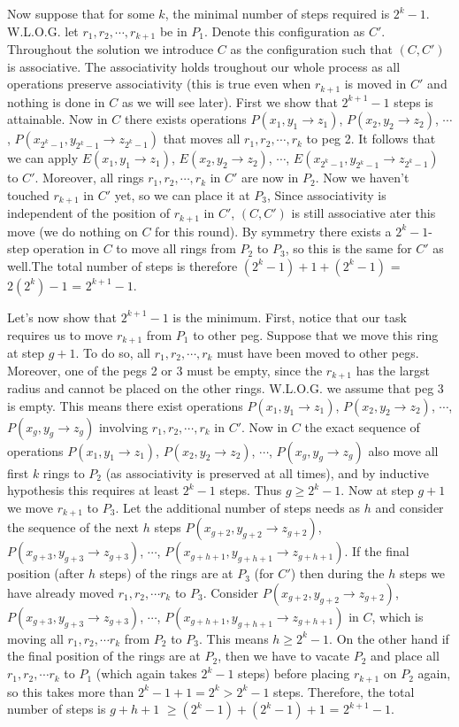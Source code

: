 \documentclass[11pt]{article}
\begin{document}
\begin{enumerate}
Now suppose that for some $k$, the minimal number of steps required is $2^k-1$. W.L.O.G. let $r_1, r_2,\cdots ,r_{k+1}$ be in $P_1$. Denote this configuration as $C'$. Throughout the solution we introduce $C$ as the configuration such that $(C, C')$ is associative. The associativity holds troughout our whole process as all operations preserve associativity (this is true even when $r_{k+1}$ is moved in $C'$ and nothing is done in $C$ as we will see later).
First we show that $2^{k+1}-1$ steps is attainable. Now in $C$ there exists operations $P(x_1, y_1\to z_1)$, $P(x_2, y_2\to z_2)$, $\cdots$, $P(x_{2^k-1}, y_{2^k-1}\to z_{2^k-1})$ that moves all $r_1, r_2, \cdots , r_k$ to peg 2. It follows that we can apply $E(x_1, y_1\to z_1)$, $E(x_2, y_2\to z_2)$, $\cdots$, $E(x_{2^k-1}, y_{2^k-1}\to z_{2^k-1})$ to $C'$. Moreover, all rings $r_1, r_2,\cdots ,r_k$ in $C'$ are now in $P_2$. Now we haven't touched $r_{k+1}$ in $C'$ yet, so we can place it at $P_3$, Since associativity is independent of the position of $r_{k+1}$ in $C'$, $(C, C')$ is still associative ater this move (we do nothing on $C$ for this round). By symmetry there exists a $2^k-1$-step operation in $C$ to move all rings from $P_2$ to $P_3$, so this is the same for $C'$ as well.The total number of steps is therefore $(2^k-1)+1+(2^k-1)$ = $2(2^k)-1$ = $2^{k+1}-1$.

Let's now show that $2^{k+1}-1$ is the minimum. First, notice that our task requires us to move $r_{k+1}$ from $P_1$ to other peg. Suppose that we move this ring at step $g+1$. To do so, all $r_1, r_2,\cdots ,r_k$ must have been moved to other pegs. Moreover, one of the pegs 2 or 3 must be empty, since the $r_{k+1}$ has the largst radius and cannot be placed on the other rings. W.L.O.G. we assume that peg 3 is empty. This means there exist operations $P(x_1, y_1\to z_1)$, $P(x_2, y_2\to z_2)$, $\cdots$, $P(x_g, y_g\to z_g)$ involving $r_1, r_2,\cdots ,r_k$ in $C'$. Now in $C$ the exact sequence of operations $P(x_1, y_1\to z_1)$, $P(x_2, y_2\to z_2)$, $\cdots$, $P(x_g, y_g\to z_g)$ also move all first $k$ rings to $P_2$ (as associativity is preserved at all times), and by inductive hypothesis this requires at least $2^k-1$ steps. Thus $g\ge 2^k-1$. Now at step $g+1$ we move $r_{k+1}$ to $P_3$. Let the additional number of steps needs as $h$ and consider the sequence of the next $h$ steps $P(x_{g+2}, y_{g+2}\to z_{g+2})$, $P(x_{g+3}, y_{g+3}\to z_{g+3})$, $\cdots$, $P(x_{g+h+1}, y_{g+h+1}\to z_{g+h+1})$. If the final position (after $h$ steps) of the rings are at $P_3$ (for $C'$) then during the $h$ steps we have already moved $r_1, r_2, \cdots r_k$ to $P_3$. Consider $P(x_{g+2}, y_{g+2}\to z_{g+2})$, $P(x_{g+3}, y_{g+3}\to z_{g+3})$, $\cdots$, $P(x_{g+h+1}, y_{g+h+1}\to z_{g+h+1})$ in $C$, which is moving all $r_1, r_2, \cdots r_k$ from $P_2$ to $P_3$. This means $h\ge 2^k-1$. On the other hand if the final position of the rings are at $P_2$, then we have to vacate $P_2$ and place all $r_1, r_2,\cdots r_k$ to $P_1$ (which again takes $2^k-1$ steps) before placing $r_{k+1}$ on $P_2$ again, so this takes more than $2^k-1+1=2^k>2^k-1$ steps. Therefore, the total number of steps is $g+h+1$ $\ge (2^k-1)+(2^k-1)+1$ = $2^{k+1}-1$.


\end{enumerate}
\end{document}
